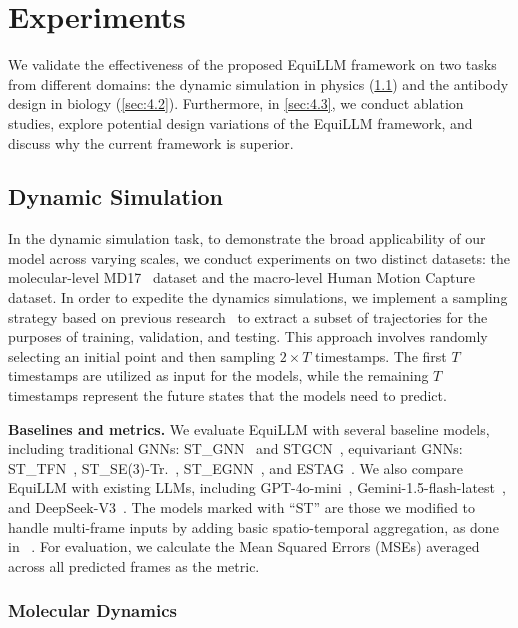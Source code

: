 \section{Experiments}
We validate the effectiveness of the proposed EquiLLM framework on two tasks from different domains: the dynamic simulation in physics (\cref{sec:4.1}) and the antibody design in biology (\cref{sec:4.2}). Furthermore, in \cref{sec:4.3}, we conduct ablation studies, explore potential design variations of the EquiLLM framework, and discuss why the current framework is superior.

\subsection{Dynamic Simulation}
\label{sec:4.1}
In the dynamic simulation task, to demonstrate the broad applicability of our model across varying scales, we conduct experiments on two distinct datasets: the molecular-level MD17~\citep{chmiela2017machine} dataset and the macro-level Human Motion Capture~\citep{de2009guide} dataset. In order to expedite the dynamics simulations, we implement a sampling strategy based on previous research~\citep{huang2022equivariant} to extract a subset of trajectories for the purposes of training, validation, and testing. This approach involves randomly selecting an initial point and then sampling $2 \times T$ timestamps. The first $T$ timestamps are utilized as input for the models, while the remaining $T$ timestamps represent the future states that the models need to predict.

\textbf{Baselines and metrics.}
We evaluate EquiLLM with several baseline models, including traditional GNNs: ST\_GNN~\citep{gilmer2017neural} and STGCN~\citep{yu2017spatio}, equivariant GNNs: ST\_TFN~\citep{thomas2018tensor}, ST\_SE(3)-Tr.~\citep{fuchs2020se}, ST\_EGNN~\citep{satorras2021n}, and ESTAG~\citep{wu2024equivariant}. We also compare EquiLLM with existing LLMs, including GPT-4o-mini~\citep{openai20244o}, Gemini-1.5-flash-latest~\citep{team2024gemini}, and DeepSeek-V3~\citep{liu2024deepseek}. The models marked with ``ST'' are those we modified to handle multi-frame inputs by adding basic spatio-temporal aggregation, as done in ~\citep{wu2024equivariant}. For evaluation, we calculate the Mean Squared Errors (MSEs) averaged across all predicted frames as the metric.

\subsubsection{Molecular Dynamics}


